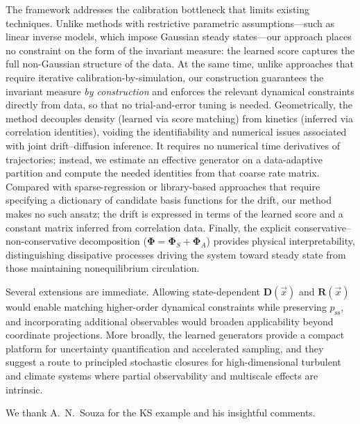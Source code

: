 \documentclass[%
  prl,
  reprint,
  amsmath,
  amssymb,
  aps
]{revtex4-2}
\newcommand{\vvec}[1]{\vec{#1}}
\begin{document}
The framework addresses the calibration bottleneck that limits existing techniques. Unlike methods with restrictive parametric assumptions---such as linear inverse models, which impose Gaussian steady states---our approach places no constraint on the form of the invariant measure: the learned score captures the full non-Gaussian structure of the data. At the same time, unlike approaches that require iterative calibration-by-simulation, our construction guarantees the invariant measure \emph{by construction} and enforces the relevant dynamical constraints directly from data, so that no trial-and-error tuning is needed. Geometrically, the method decouples density (learned via score matching) from kinetics (inferred via correlation identities), voiding the identifiability and numerical issues associated with joint drift–diffusion inference. It requires no numerical time derivatives of trajectories; instead, we estimate an effective generator on a data-adaptive partition and compute the needed identities from that coarse rate matrix. Compared with sparse-regression or library-based approaches that require specifying a dictionary of candidate basis functions for the drift, our method makes no such ansatz; the drift is expressed in terms of the learned score and a constant matrix inferred from correlation data. Finally, the explicit conservative--non-conservative decomposition ($\bm{\Phi}=\bm{\Phi}_S+\bm{\Phi}_A$) provides physical interpretability, distinguishing dissipative processes driving the system toward steady state from those maintaining nonequilibrium circulation.

Several extensions are immediate. Allowing state-dependent $\bm{D}(\vvec{x})$ and $\bm{R}(\vvec{x})$ would enable matching higher-order dynamical constraints while preserving $p_{\mathrm{ss}}$, and incorporating additional observables would broaden applicability beyond coordinate projections. More broadly, the learned generators provide a compact platform for uncertainty quantification and accelerated sampling, and they suggest a route to principled stochastic closures for high-dimensional turbulent and climate systems where partial observability and multiscale effects are intrinsic.


\begin{acknowledgments}
We thank A.~N.~Souza for the KS example and his insightful comments.
\end{acknowledgments}

\clearpage
\onecolumngrid
\end{document}

